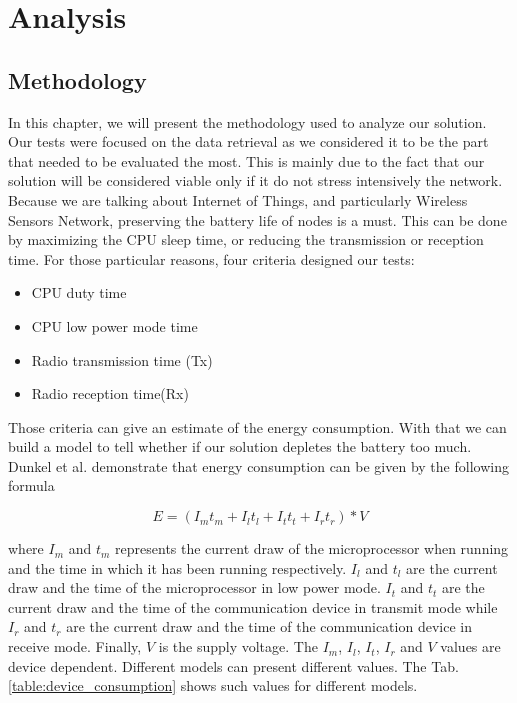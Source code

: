 \part{Analysis}  \label{part:analysis}

\chapter{Methodology}

In this chapter, we will present the methodology used to analyze our solution. Our tests were focused on the data retrieval as we considered it to be the part that needed to be evaluated the most. This is mainly due to the fact that our solution will be considered viable only if it do not stress intensively the network. Because we are talking about Internet of Things, and particularly Wireless Sensors Network, preserving the battery life of nodes is a must. This can be done by maximizing the CPU sleep time, or reducing the transmission or reception time. For those particular reasons, four criteria designed our tests:

\begin{itemize}
  \item CPU duty time
  \item CPU low power mode time
  \item Radio transmission time (Tx)
  \item Radio reception time(Rx)\\
\end{itemize}

Those criteria can give an estimate of the energy consumption. With that we can build a model to tell whether if our solution depletes the battery too much. Dunkel et al. \cite{dunkels2007software} demonstrate that energy consumption can be given by the following formula

\begin{equation}
  E = (I_m t_m + I_l t_l + I_t t_t + I_r t_r) * V
\end{equation}

where $I_m$ and $t_m$ represents the current draw of the microprocessor when running and the time in which it has been running respectively. $I_l$ and $t_l$  are the current draw and the time of the microprocessor in low power mode. $I_t$ and $t_t$ are the current draw and the time of the communication device in transmit mode while $I_r$ and $t_r$ are the current draw and the time of the communication device in receive mode. Finally, $V$ is the supply voltage. The $I_m$, $I_l$, $I_t$, $I_r$ and $V$ values are device dependent. Different models can present different values. The Tab.\ref{table:device_consumption} shows such values for different models.\\

